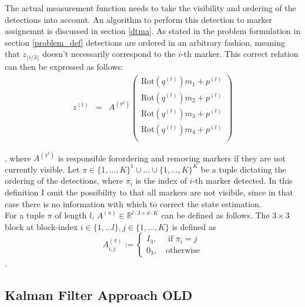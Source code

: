 \documentclass{article}
\begin{document}
The actual measurement function needs to take the visibility and ordering of the detections into account. An algorithm to perform this detection to marker assignemnt is discussed in section \ref{dtma}.
As stated in the problem formulation in section \ref{problem_def} detections are ordered in an arbitrary fashion, meaning that $z_{\lfloor i / 3 \rfloor}$ doesn't necessarily correspond to the $i\text{-th}$ marker. This correct relation can then be expressed as follows:
\begin{eqnarray}
z^{(t)} &=& A^{(\pi^{t})} \begin{pmatrix}
\text{Rot}(q^{(t)})m_1 + p^{(t)} \\
\text{Rot}(q^{(t)})m_2 + p^{(t)} \\
\text{Rot}(q^{(t)})m_3 + p^{(t)} \\
\text{Rot}(q^{(t)})m_4 + p^{(t)} \\
\end{pmatrix}
\end{eqnarray}

, where $A^{(\pi^{t})}$ is responsible forordering and removing markers if they are not currently visible. 
Let $ \pi \in  \{1, \dots, K\}^1 \cup \dots \cup \{1, \dots, K\}^K$ be a tuple dictating the ordering of the detections, where $\pi_i$ is the index of $i\text{-th}$ marker detected. In this definition I omit the possibility to that all markers are not visibile, since in that case there is no information with which to correct the state estimation.\\
For a tuple $\pi$ of length $l$, $A^{(\pi)} \in \mathbb{R}^{l \cdot 3 \times d \cdot K}$ can be defined as follows. The $3 \times 3$ block at block-index $i \in \{1, \dots l\}, j \in \{1, \dots, K\}$ is defined as
\begin{equation}
	A^{(\pi)}_{i,j} := \begin{cases}
							I_3, \quad \text{ if } \pi_i=j \\
							0_3, \quad \text{otherwise}
				  	       \end{cases}
\end{equation}.







\subsection{Kalman Filter Approach OLD}
\label{kalman_filter_approach}
\end{document}
